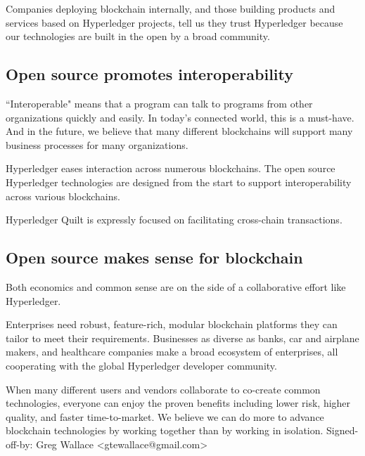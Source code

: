 Companies deploying blockchain internally, and those building products and services based on Hyperledger projects, tell us they trust Hyperledger because our technologies are built in the open by a broad community. 

\subsection{Open source promotes interoperability}
``Interoperable" means that a program can talk to programs from other organizations quickly and easily. In today's connected world, this is a must-have.
And in the future, we believe that many different blockchains will support many business processes for many organizations. 

Hyperledger eases interaction across numerous blockchains. The open source Hyperledger technologies are designed from the start to support interoperability across various blockchains.  

Hyperledger Quilt is expressly focused on facilitating cross-chain transactions.

\subsection{Open source makes sense for blockchain}
Both economics and common sense are on the side of a collaborative effort like Hyperledger. 

Enterprises need robust, feature-rich, modular blockchain platforms they can tailor to meet their requirements. 
Businesses as diverse as banks, car and airplane makers, and healthcare companies make a broad ecosystem of enterprises, all cooperating with the global Hyperledger developer community.

When many different users and vendors collaborate to co-create common technologies, everyone can enjoy the proven benefits including lower risk, higher quality, and faster time-to-market. 
We believe we can do more to advance blockchain technologies by working together than by working in isolation. 
Signed-off-by: Greg Wallace <gtewallace@gmail.com>
